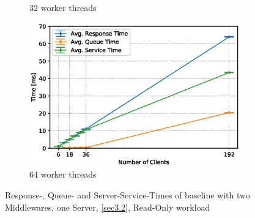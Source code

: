 \documentclass[11pt,a4paper]{article}
\begin{document}
\begin{figure}
\begin{subfigure}{.5\textwidth}
        \caption{32 worker threads}
    \end{subfigure}
    \begin{subfigure}{.5\textwidth}
        \includegraphics[width=1\linewidth]{plots/3_2a_extendedLatencyMiddleware_64w.eps}
        \caption{64 worker threads}
    \end{subfigure}

    \caption{Response-, Queue- and Server-Service-Times of baseline with two Middlewares, one Server, \autoref{sec3.2}, Read-Only workload}
    \label{fig:3-2-times-readonly}
\end{figure}
\end{document}
